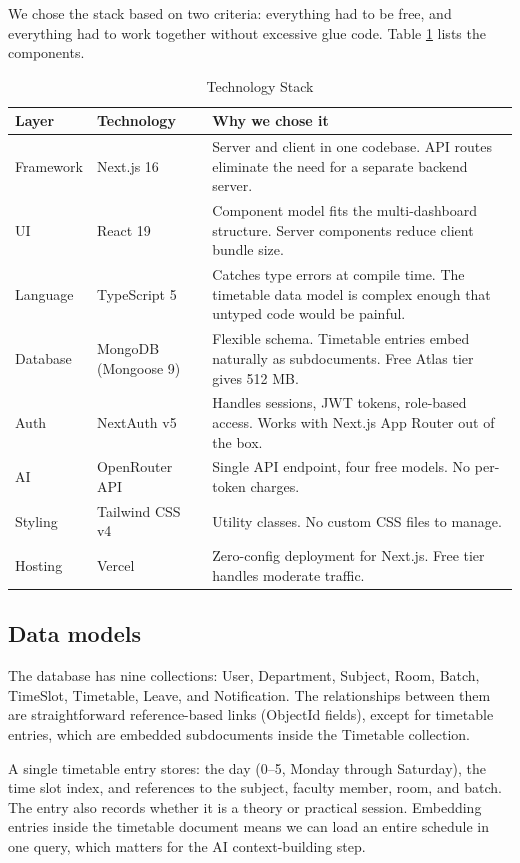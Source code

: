 \documentclass[conference]{IEEEtran}
\begin{document}
We chose the stack based on two criteria: everything had to be free, and everything had to work together without excessive glue code. Table \ref{tab:stack} lists the components.

\begin{table}[htbp]
\caption{Technology Stack}
\label{tab:stack}
\centering
\begin{tabular}{@{}llp{3.8cm}@{}}
\toprule
\textbf{Layer} & \textbf{Technology} & \textbf{Why we chose it} \\
\midrule
Framework & Next.js 16 & Server and client in one codebase. API routes eliminate the need for a separate backend server. \\
UI & React 19 & Component model fits the multi-dashboard structure. Server components reduce client bundle size. \\
Language & TypeScript 5 & Catches type errors at compile time. The timetable data model is complex enough that untyped code would be painful. \\
Database & MongoDB (Mongoose 9) & Flexible schema. Timetable entries embed naturally as subdocuments. Free Atlas tier gives 512 MB. \\
Auth & NextAuth v5 & Handles sessions, JWT tokens, role-based access. Works with Next.js App Router out of the box. \\
AI & OpenRouter API & Single API endpoint, four free models. No per-token charges. \\
Styling & Tailwind CSS v4 & Utility classes. No custom CSS files to manage. \\
Hosting & Vercel & Zero-config deployment for Next.js. Free tier handles moderate traffic. \\
\bottomrule
\end{tabular}
\end{table}

\subsection{Data models}

The database has nine collections: User, Department, Subject, Room, Batch, TimeSlot, Timetable, Leave, and Notification. The relationships between them are straightforward reference-based links (ObjectId fields), except for timetable entries, which are embedded subdocuments inside the Timetable collection.

A single timetable entry stores: the day (0--5, Monday through Saturday), the time slot index, and references to the subject, faculty member, room, and batch. The entry also records whether it is a theory or practical session. Embedding entries inside the timetable document means we can load an entire schedule in one query, which matters for the AI context-building step.
\end{document}
